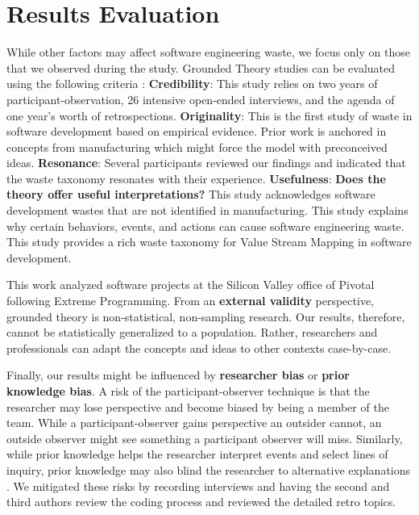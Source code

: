 \section{Results Evaluation}
\label{ResultsEvaluation}
While other factors may affect software engineering waste, we focus only on those that we observed during the study. Grounded Theory studies can be evaluated using the following criteria \cite{Charmaz, StolGroundedTheory}:
\textbf{Credibility}:   This study relies on two years of participant-observation, 26 intensive open-ended interviews, and the agenda of one year's worth of retrospections. 
\textbf{Originality}:   This is the first study of waste in software development based on empirical evidence. Prior work is anchored in concepts from manufacturing which might force the model with preconceived ideas. 
\textbf{Resonance}:  Several participants reviewed our findings and indicated that the waste taxonomy resonates with their experience.
\textbf{Usefulness}: \textbf{Does the theory offer useful interpretations?} This study acknowledges software development wastes that are not identified in manufacturing. This study explains why certain behaviors, events, and actions can cause software engineering waste. This study provides a rich waste taxonomy for Value Stream Mapping in software development. 

This work analyzed software projects at the Silicon Valley office of Pivotal following Extreme Programming. From an \textbf{external validity} perspective, grounded theory is non-statistical, non-sampling research. Our results, therefore, cannot be statistically generalized to a population. Rather, researchers and professionals can adapt the concepts and ideas to other contexts case-by-case.

Finally, our results might be influenced by \textbf{researcher bias} or \textbf{prior knowledge bias}. A risk of the participant-observer technique is that the researcher may lose perspective and become biased by being a member of the team. While a participant-observer gains perspective an outsider cannot, an outside observer might see something a participant observer will miss. Similarly, while prior knowledge helps the researcher interpret events and select lines of inquiry, prior knowledge may also blind the researcher to alternative explanations \cite{GlaserIssues}. We mitigated these risks by recording interviews and having the second and third authors review the coding process and reviewed the detailed retro topics.

